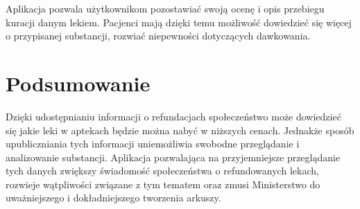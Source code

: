 \documentclass{article}
\begin{document}
Aplikacja pozwala użytkownikom pozostawiać swoją ocenę i opis przebiegu kuracji danym lekiem. Pacjenci mają dzięki temu możliwość dowiedzieć się więcej o przypisanej substancji, rozwiać niepewności dotyczących dawkowania.


\section{Podsumowanie}

Dzięki udostępnianiu informacji o refundacjach społeczeństwo może dowiedzieć się jakie leki w aptekach będzie można nabyć w niższych cenach. Jednakże sposób upubliczniania tych informacji uniemożliwia swobodne przeglądanie i analizowanie substancji. Aplikacja pozwalająca na przyjemniejsze przeglądanie tych danych zwiększy świadomość społeczeństwa o refundowanych lekach, rozwieje wątpliwości związane z tym tematem oraz zmusi Ministerstwo do uważniejszego i dokładniejszego tworzenia arkuszy.
\end{document}
